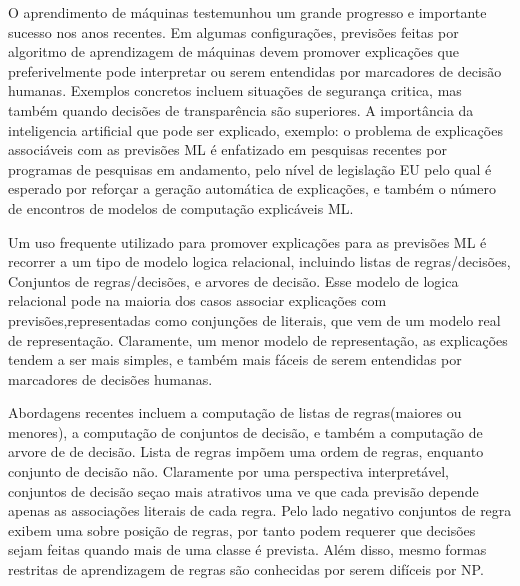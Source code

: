 \documentclass[a4paper, 12 pt]{article}
\begin{document}
O aprendimento de máquinas testemunhou um grande progresso e importante sucesso nos anos recentes. Em algumas configurações, previsões feitas por algoritmo de aprendizagem de máquinas devem promover explicações que preferivelmente pode interpretar ou serem entendidas por marcadores de decisão humanas. Exemplos concretos incluem situações de segurança critica, mas também quando decisões de transparência são superiores. A importância da inteligencia artificial que pode ser explicado, exemplo: o problema de explicações associáveis com as previsões ML é enfatizado em pesquisas recentes por programas de pesquisas em andamento, pelo nível de legislação EU pelo qual é esperado por reforçar a geração automática de explicações, e também o número de encontros de modelos de computação explicáveis ML.
	
	Um uso frequente utilizado para promover explicações para as previsões ML é recorrer a um tipo de modelo logica relacional, incluindo listas de regras/decisões, Conjuntos de regras/decisões, e arvores de decisão. Esse modelo de logica relacional pode na maioria dos casos associar explicações com previsões,representadas como conjunções de literais, que vem de um modelo real de representação. Claramente, um menor modelo de representação, as explicações tendem a ser mais simples, e também mais fáceis de serem entendidas por marcadores de decisões humanas.
	
	Abordagens recentes incluem a computação de listas de regras(maiores ou menores), a computação de conjuntos de decisão, e também a computação de arvore de de decisão. Lista de regras impõem uma ordem de regras, enquanto conjunto de decisão não. Claramente por uma perspectiva interpretável, conjuntos de decisão seçao mais atrativos uma ve que cada previsão depende apenas as associações literais de cada regra. Pelo lado negativo conjuntos de regra exibem uma sobre posição de regras, por tanto podem requerer que decisões sejam feitas quando mais de uma classe é prevista. Além disso, mesmo formas restritas de aprendizagem de regras são conhecidas por serem difíceis por NP.
	
\end{document}
